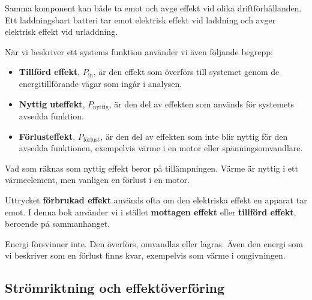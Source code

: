 \documentclass[
  swedish,
  11pt,
  a4paper,
  DIV=11,
  numbers=noendperiod,
  twoside,
  open=any]{scrreprt}
\providecommand{\tightlist}{%
  \setlength{\itemsep}{0pt}\setlength{\parskip}{0pt}}
\begin{document}
Samma komponent kan både ta emot och avge effekt vid olika
driftförhållanden. Ett laddningsbart batteri tar emot elektrisk effekt
vid laddning och avger elektrisk effekt vid urladdning.

När vi beskriver ett systems funktion använder vi även följande begrepp:

\begin{itemize}
\tightlist
\item
  \textbf{Tillförd effekt}, \(P_\mathrm{in}\), är den effekt som
  överförs till systemet genom de energitillförande vägar som ingår i
  analysen.
\item
  \textbf{Nyttig uteffekt}, \(P_\mathrm{nyttig}\), är den del av
  effekten som används för systemets avsedda funktion.
\item
  \textbf{Förlusteffekt}, \(P_\mathrm{förlust}\), är den del av effekten
  som inte blir nyttig för den avsedda funktionen, exempelvis värme i en
  motor eller spänningsomvandlare.
\end{itemize}

Vad som räknas som nyttig effekt beror på tillämpningen. Värme är nyttig
i ett värmeelement, men vanligen en förlust i en motor.

\begin{tcolorbox}[enhanced jigsaw, arc=.35mm, bottomrule=.15mm, bottomtitle=1mm, breakable, colback=white, colbacktitle=quarto-callout-important-color!10!white, colframe=quarto-callout-important-color-frame, coltitle=black, left=2mm, leftrule=.75mm, opacityback=0, opacitybacktitle=0.6, rightrule=.15mm, title=\textcolor{quarto-callout-important-color}{\faExclamation}\hspace{0.5em}{Förbrukad effekt och energiförluster}, titlerule=0mm, toprule=.15mm, toptitle=1mm]

Uttrycket \textbf{förbrukad effekt} används ofta om den elektriska
effekt en apparat tar emot. I denna bok använder vi i stället
\textbf{mottagen effekt} eller \textbf{tillförd effekt}, beroende på
sammanhanget.

Energi försvinner inte. Den överförs, omvandlas eller lagras. Även den
energi som vi beskriver som en förlust finns kvar, exempelvis som värme
i omgivningen.

\end{tcolorbox}

\subsection{Strömriktning och
effektöverföring}\label{sec-effekt-stromriktning-och-effektoverforing}
\end{document}
